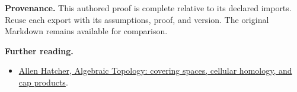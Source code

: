 \documentclass[preprint,12pt,aps,pra,showkeys,amsmath,amssymb,superscriptaddress,floatfix]{revtex4-2}
\theoremstyle{definition}
\theoremstyle{remark}
\providecommand{\tightlist}{\setlength{\itemsep}{2pt}\setlength{\parskip}{0pt}}
\begin{document}
\par\medskip\begingroup\small\linespread{1.0}\selectfont\noindent\textbf{Provenance.} This authored proof is complete relative to its declared imports. Reuse
each export with its assumptions, proof, and version. The original
Markdown remains available for comparison.
\par\endgroup

\par\smallskip\begingroup\small\linespread{1.0}\selectfont\noindent\textbf{Further reading.} \begin{itemize}
\tightlist
\item
  \href{https://pi.math.cornell.edu/~hatcher/AT/AT.pdf}{Allen Hatcher,
  Algebraic Topology: covering spaces, cellular homology, and cap
  products}.
\end{itemize}\par\endgroup
\end{document}

